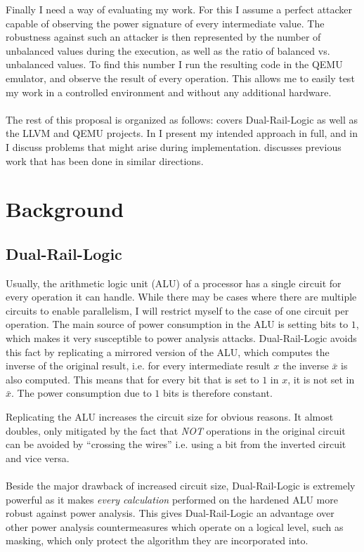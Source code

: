 \documentclass{article}
\newcommand{\qemu}{QEMU}
\newcommand{\dual}{Dual-Rail-Logic}
\newcommand{\llvm}{LLVM}
\newcommand{\exposee}{proposal}
\begin{document}
Finally I need a way of evaluating my work.
For this I assume a perfect attacker capable of observing the power signature of every intermediate value.
The robustness against such an attacker is then represented by the number of unbalanced values during the execution, as well as the ratio of balanced vs. unbalanced values.
To find this number I run the resulting code in the \qemu{} emulator, and observe the result of every operation.
This allows me to easily test my work in a controlled environment and without any additional hardware.
\\
\\
The rest of this \exposee{} is organized as follows:
 covers \dual{} as well as the \llvm{} and \qemu{} projects.
In  I present my intended approach in full, and in  I discuss problems that might arise during implementation.
 discusses previous work that has been done in similar directions.

\section{Background}
\label{sec:background}
\subsection{\dual{}}
Usually, the arithmetic logic unit (ALU) of a processor has a single circuit for every operation it can handle.
While there may be cases where there are multiple circuits to enable parallelism, I will restrict myself to the case of one circuit per operation.
The main source of power consumption in the ALU is setting bits to $1$, which makes it very susceptible to power analysis attacks.
\dual{} avoids this fact by replicating a mirrored version of the ALU, which computes the inverse of the original result, i.e. for every intermediate result $x$ the inverse $\bar{x}$ is also computed.
This means that for every bit that is set to $1$ in $x$, it is not set in $\bar{x}$.
The power consumption due to $1$ bits is therefore constant.

Replicating the ALU increases the circuit size for obvious reasons.
It almost doubles, only mitigated by the fact that \emph{NOT} operations in the original circuit can be avoided by ``crossing the wires'' i.e. using a bit from the inverted circuit and vice versa.
\\
\\
Beside the major drawback of increased circuit size, \dual{} is extremely powerful as it makes \emph{every calculation} performed on the hardened ALU more robust against power analysis.
This gives \dual{} an advantage over other power analysis countermeasures which operate on a logical level, such as masking\cite{messerges2000securing}, which only protect the algorithm they are incorporated into.
\end{document}
